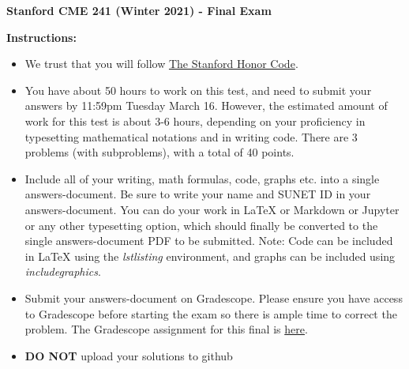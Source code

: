 \documentclass[12pt]{exam}
\begin{document}
\begin{center}
{\large {\bf Stanford CME 241 (Winter 2021) - Final Exam}}
\end{center}
{\large{\bf Instructions:}}
\begin{itemize}
\item We trust that you will follow \href{https://communitystandards.stanford.edu/policies-and-guidance/honor-code}{The Stanford Honor Code}.
\item You have about 50 hours to work on this test, and need to submit your answers by 11:59pm Tuesday March 16. However, the estimated amount of work for this test is about 3-6 hours, depending on your proficiency in typesetting mathematical notations and in writing code. There are 3 problems (with subproblems), with a total of 40 points.
\item Include all of your writing, math formulas, code, graphs etc. into a single answers-document. Be sure to write your name and SUNET ID in your answers-document. You can do your work in LaTeX or Markdown or Jupyter or any other typesetting option, which should finally be converted to the single answers-document PDF to be submitted. Note: Code can be included in LaTeX using the {\em lstlisting} environment, and graphs can be included using {\em includegraphics}.
\item Submit your answers-document on Gradescope. Please ensure you have access to Gradescope before starting the exam so there is ample time to correct the problem. The Gradescope assignment for this final is  \href{https://www.gradescope.com/courses/245396/assignments/1097505/}{here}.
\item {\bf DO NOT} upload your solutions to github 
\end{itemize}
 
\end{document}
